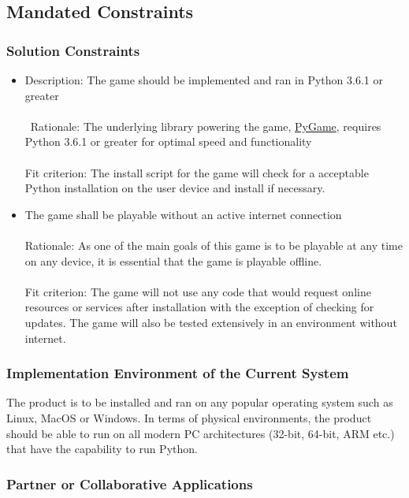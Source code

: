 \documentclass[12pt, titlepage]{article}
\begin{document}
\subsection{Mandated Constraints}
\subsubsection{Solution Constraints}
\begin{itemize}
    \item Description: The game should be implemented and ran in Python 3.6.1 or greater 
    \\\\\
    Rationale: The underlying library powering the game, \href{https://www.pygame.org/news}{PyGame}, requires Python 3.6.1 or greater for optimal speed and functionality 
    \\\\
    Fit criterion: The install script for the game will check for a acceptable Python installation on the user device and install if necessary.
    \item The game shall be playable without an active internet connection
    \\\\
    Rationale: As one of the main goals of this game is to be playable at any time on any device, it is essential that the game is playable offline.
    \\\\
    Fit criterion: The game will not use any code that would request online resources or services after installation with the exception of checking for updates. The game will also be tested extensively in an environment without internet.
    
\end{itemize}

\subsubsection{Implementation Environment of the Current System}
The product is to be installed and ran on any popular operating system such as Linux, MacOS or Windows. In terms of physical environments, the product should be able to run on all modern PC architectures (32-bit, 64-bit, ARM etc.) that have the capability to run Python.

\subsubsection{Partner or Collaborative Applications}
\end{document}
